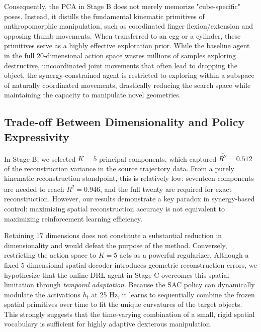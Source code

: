 \documentclass[letterpaper, 10 pt, conference]{ieeeconf}  %
\begin{document}
Consequently, the PCA in Stage B does not merely memorize "cube-specific" poses. Instead, it distills the fundamental kinematic primitives of anthropomorphic manipulation, such as coordinated finger flexion/extension and opposing thumb movements. When transferred to an egg or a cylinder, these primitives serve as a highly effective exploration prior. While the baseline agent in the full 20-dimensional action space wastes millions of samples exploring destructive, uncoordinated joint movements that often lead to dropping the object, the synergy-constrained agent is restricted to exploring within a subspace of naturally coordinated movements, drastically reducing the search space while maintaining the capacity to manipulate novel geometries.


\subsection{Trade-off Between Dimensionality and Policy Expressivity}
In Stage B, we selected $K=5$ principal components, which captured $\overline{R^2}=0.512$ of the reconstruction variance in the source trajectory data. From a purely kinematic reconstruction standpoint, this is relatively low: seventeen components are needed to reach $\overline{R^2}=0.946$, and the full twenty are required for exact reconstruction. However, our results demonstrate a key paradox in synergy-based control: maximizing spatial reconstruction accuracy is not equivalent to maximizing reinforcement learning efficiency. 

Retaining 17 dimensions does not constitute a substantial reduction in dimensionality and would defeat the purpose of the method. Conversely, restricting the action space to $K=5$ acts as a powerful regularizer. Although a fixed 5-dimensional spatial decoder introduces geometric reconstruction errors, we hypothesize that the online DRL agent in Stage C overcomes this spatial limitation through \textit{temporal adaptation}. Because the SAC policy can dynamically modulate the activations $h_t$ at 25 Hz, it learns to sequentially combine the frozen spatial primitives over time to fit the unique curvatures of the target objects. This strongly suggests that the time-varying combination of a small, rigid spatial vocabulary is sufficient for highly adaptive dexterous manipulation.
\end{document}
